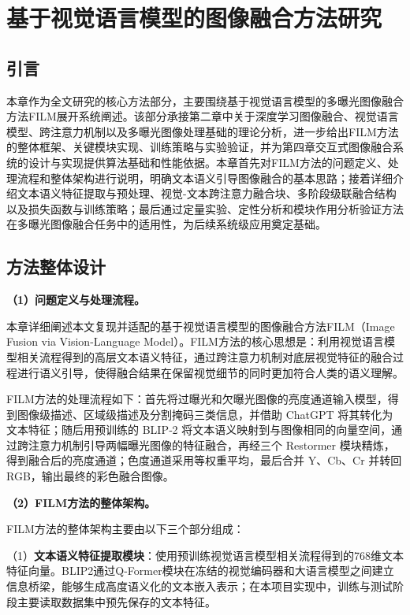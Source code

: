 \section{基于视觉语言模型的图像融合方法研究}\label{ch:method}

\subsection{引言}\label{sec:ch3_intro}

本章作为全文研究的核心方法部分，主要围绕基于视觉语言模型的多曝光图像融合方法FILM展开系统阐述。该部分承接第二章中关于深度学习图像融合、视觉语言模型、跨注意力机制以及多曝光图像处理基础的理论分析，进一步给出FILM方法的整体框架、关键模块实现、训练策略与实验验证，并为第四章交互式图像融合系统的设计与实现提供算法基础和性能依据。本章首先对FILM方法的问题定义、处理流程和整体架构进行说明，明确文本语义引导图像融合的基本思路；接着详细介绍文本语义特征提取与预处理、视觉-文本跨注意力融合块、多阶段级联融合结构以及损失函数与训练策略；最后通过定量实验、定性分析和模块作用分析验证方法在多曝光图像融合任务中的适用性，为后续系统级应用奠定基础。

\subsection{方法整体设计}\label{sec:method_overview}

\textbf{（1）问题定义与处理流程。}

本章详细阐述本文复现并适配的基于视觉语言模型的图像融合方法FILM（Image Fusion via Vision-Language Model）\supercite{zhao2024film}。FILM方法的核心思想是：利用视觉语言模型相关流程得到的高层文本语义特征，通过跨注意力机制对底层视觉特征的融合过程进行语义引导，使得融合结果在保留视觉细节的同时更加符合人类的语义理解。

FILM方法的处理流程如下：首先将过曝光和欠曝光图像的亮度通道输入模型，得到图像级描述、区域级描述及分割掩码三类信息，并借助 ChatGPT 将其转化为文本特征；随后用预训练的 BLIP‑2 将文本语义映射到与图像相同的向量空间，通过跨注意力机制引导两幅曝光图像的特征融合，再经三个 Restormer 模块精炼，得到融合后的亮度通道；色度通道采用等权重平均，最后合并 Y、Cb、Cr 并转回 RGB，输出最终的彩色融合图像。

\textbf{（2）FILM方法的整体架构。}

FILM方法的整体架构主要由以下三个部分组成：

（1）\textbf{文本语义特征提取模块}：使用预训练视觉语言模型相关流程得到的768维文本特征向量。BLIP2通过Q-Former模块在冻结的视觉编码器和大语言模型之间建立信息桥梁，能够生成高度语义化的文本嵌入表示；在本项目实现中，训练与测试阶段主要读取数据集中预先保存的文本特征。

